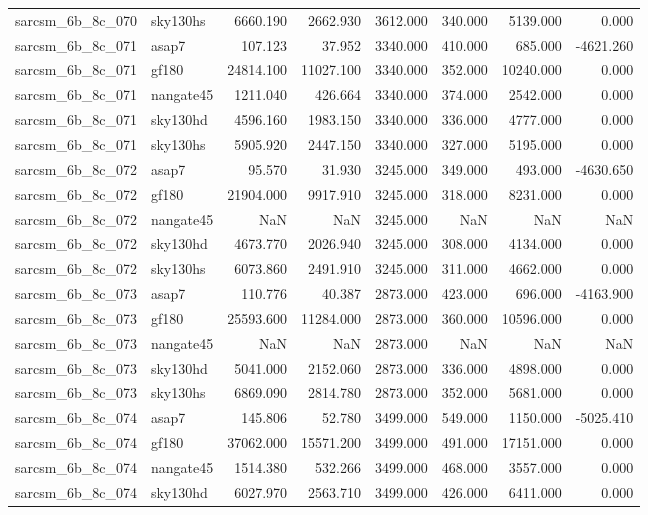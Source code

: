 \begin{tabular}{llrrrrrr}
sarcsm\_6b\_8c\_070 & sky130hs & 6660.190 & 2662.930 & 3612.000 & 340.000 & 5139.000 & 0.000 \\
sarcsm\_6b\_8c\_071 & asap7 & 107.123 & 37.952 & 3340.000 & 410.000 & 685.000 & -4621.260 \\
sarcsm\_6b\_8c\_071 & gf180 & 24814.100 & 11027.100 & 3340.000 & 352.000 & 10240.000 & 0.000 \\
sarcsm\_6b\_8c\_071 & nangate45 & 1211.040 & 426.664 & 3340.000 & 374.000 & 2542.000 & 0.000 \\
sarcsm\_6b\_8c\_071 & sky130hd & 4596.160 & 1983.150 & 3340.000 & 336.000 & 4777.000 & 0.000 \\
sarcsm\_6b\_8c\_071 & sky130hs & 5905.920 & 2447.150 & 3340.000 & 327.000 & 5195.000 & 0.000 \\
sarcsm\_6b\_8c\_072 & asap7 & 95.570 & 31.930 & 3245.000 & 349.000 & 493.000 & -4630.650 \\
sarcsm\_6b\_8c\_072 & gf180 & 21904.000 & 9917.910 & 3245.000 & 318.000 & 8231.000 & 0.000 \\
sarcsm\_6b\_8c\_072 & nangate45 & NaN & NaN & 3245.000 & NaN & NaN & NaN \\
sarcsm\_6b\_8c\_072 & sky130hd & 4673.770 & 2026.940 & 3245.000 & 308.000 & 4134.000 & 0.000 \\
sarcsm\_6b\_8c\_072 & sky130hs & 6073.860 & 2491.910 & 3245.000 & 311.000 & 4662.000 & 0.000 \\
sarcsm\_6b\_8c\_073 & asap7 & 110.776 & 40.387 & 2873.000 & 423.000 & 696.000 & -4163.900 \\
sarcsm\_6b\_8c\_073 & gf180 & 25593.600 & 11284.000 & 2873.000 & 360.000 & 10596.000 & 0.000 \\
sarcsm\_6b\_8c\_073 & nangate45 & NaN & NaN & 2873.000 & NaN & NaN & NaN \\
sarcsm\_6b\_8c\_073 & sky130hd & 5041.000 & 2152.060 & 2873.000 & 336.000 & 4898.000 & 0.000 \\
sarcsm\_6b\_8c\_073 & sky130hs & 6869.090 & 2814.780 & 2873.000 & 352.000 & 5681.000 & 0.000 \\
sarcsm\_6b\_8c\_074 & asap7 & 145.806 & 52.780 & 3499.000 & 549.000 & 1150.000 & -5025.410 \\
sarcsm\_6b\_8c\_074 & gf180 & 37062.000 & 15571.200 & 3499.000 & 491.000 & 17151.000 & 0.000 \\
sarcsm\_6b\_8c\_074 & nangate45 & 1514.380 & 532.266 & 3499.000 & 468.000 & 3557.000 & 0.000 \\
sarcsm\_6b\_8c\_074 & sky130hd & 6027.970 & 2563.710 & 3499.000 & 426.000 & 6411.000 & 0.000 \\

\end{tabular}
